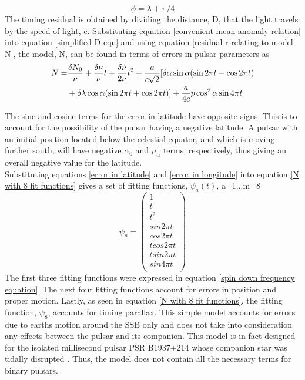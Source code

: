 \documentclass[12pt]{article}
\begin{document}
	\begin{equation}\label{convenient mean anomaly relation}
	\phi=\lambda +\pi/4
	\end{equation}
	The timing residual is obtained by dividing the distance, D, that the light travels by the speed of light, c. Substituting equation \ref{convenient mean anomaly relation} into equation \ref{simplified D eqn} and using equation \ref{residual r relating to model N}, the model, N, can be found in terms of errors in pulsar parameters as
	\begin{equation}{\label{N with 8 fit functions}}
	\begin{aligned}
	N=&\frac{\delta N_{0}}{\nu}+\frac{\delta \nu}{\nu}t+\frac{\delta \dot\nu }{2 \nu}t^2+\frac{a}{c \sqrt{2}}[\delta\alpha \sin{\alpha}(\sin{2 \pi t}-\cos{2 \pi t})\\
	&+\delta\lambda \cos{\alpha}(\sin{2 \pi t}+\cos{2 \pi t})] +\frac{a}{4c}p\cos^{2}\alpha \sin{4 \pi t}
	\end{aligned}
	\end{equation}

	The sine and cosine terms for the error in latitude have opposite signs. This is to account for the possibility of the pulsar having a negative latitude. A pulsar with an initial position located below the celestial equator, and which is moving further south, will have negative $\alpha_{0}$ and $\mu_{\alpha}$ terms, respectively, thus giving an overall negative value for the latitude.\\
	Substituting equations \ref{error in latitude} and \ref{error in longitude} into equation \ref{N with 8 fit functions} gives a set of fitting functions, $\psi_a(t)$, a=1...m=8 \cite{blandford1976arrival} 
	$$
	\psi_a=
	\begin{pmatrix}
	1\\
	t\\
	t^2\\
	sin2 \pi t\\
	cos2 \pi t\\
	t cos2 \pi t\\
	t sin2 \pi t\\
	sin4 \pi t\\
	\end{pmatrix}
	$$
	The first three fitting functions were expressed in equation \ref{spin down frequency equation}. The next four fitting functions account for errors in position and proper motion. Lastly, as seen in equation \ref{N with 8 fit functions}, the fitting function, $\psi_{8}$, accounts for timing parallax. 
	This simple model accounts for  errors due to earths motion around the SSB only and does not take into consideration any effects between the pulsar and its companion. This model is in fact designed for the isolated millisecond pulsar PSR B1937+214 whose companion star was tidally disrupted \cite{kochhar1984model}. Thus, the model does not contain all the necessary terms for binary pulsars.\\
	
\end{document}
